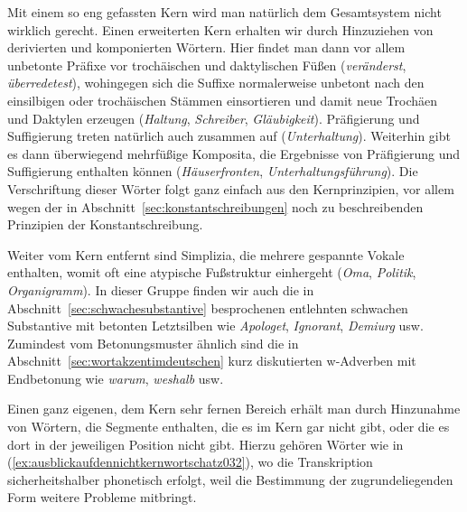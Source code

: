 Mit einem so eng gefassten Kern wird man natürlich dem Gesamtsystem nicht wirklich gerecht.
Einen erweiterten Kern erhalten wir durch Hinzuziehen von derivierten und komponierten Wörtern.
Hier findet man dann vor allem unbetonte Präfixe vor trochäischen und daktylischen Füßen (\textit{veränderst}, \textit{überredetest}), wohingegen sich die Suffixe normalerweise unbetont nach den einsilbigen oder trochäischen Stämmen einsortieren und damit neue Trochäen und Daktylen erzeugen (\textit{Haltung}, \textit{Schreiber}, \textit{Gläubigkeit}).
Präfigierung und Suffigierung treten natürlich auch zusammen auf (\textit{Unterhaltung}).
Weiterhin gibt es dann überwiegend mehrfüßige Komposita, die Ergebnisse von Präfigierung und Suffigierung enthalten können (\textit{Häuserfronten}, \textit{Unterhaltungsführung}).
Die Verschriftung dieser Wörter folgt ganz einfach aus den Kernprinzipien, vor allem wegen der in Abschnitt~\ref{sec:konstantschreibungen} noch zu beschreibenden Prinzipien der Konstantschreibung.

Weiter vom Kern entfernt sind Simplizia, die mehrere gespannte Vokale enthalten, womit oft eine atypische Fußstruktur einhergeht (\textit{Oma}, \textit{Politik}, \textit{Organigramm}).
In dieser Gruppe finden wir auch die in Abschnitt~\ref{sec:schwachesubstantive} besprochenen entlehnten schwachen Substantive mit betonten Letztsilben wie \textit{Apologet}, \textit{Ignorant}, \textit{Demiurg} usw.
Zumindest vom Betonungsmuster ähnlich sind die in Abschnitt~\ref{sec:wortakzentimdeutschen} kurz diskutierten w-Adverben mit Endbetonung wie \textit{warum}, \textit{weshalb} usw.

Einen ganz eigenen, dem Kern sehr fernen Bereich erhält man durch Hinzunahme von Wörtern, die Segmente enthalten, die es im Kern gar nicht gibt, oder die es dort in der jeweiligen Position nicht gibt.
Hierzu gehören Wörter wie in (\ref{ex:ausblickaufdennichtkernwortschatz032}), wo die Transkription sicherheitshalber phonetisch erfolgt, weil die Bestimmung der zugrundeliegenden Form weitere Probleme mitbringt.

\begin{exe}
  \ex\label{ex:ausblickaufdennichtkernwortschatz032}
  \begin{xlist}
  \end{xlist}
\end{exe}

